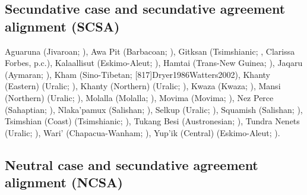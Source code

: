 \documentclass{scrartcl}
\begin{document}
\subsection{Secundative case and secundative agreement alignment (SCSA)}\label{sapp:scsa}

{\footnotesize
Aguaruna (Jivaroan; \cites[120, 215, 444]{Overall2007}[63]{Birchall2014}), Awa
Pit (Barbacoan; \cite[73, 74, 76, 102]{Curnow1997}), Gitksan
(Tsimshianic; \cites[129, 157]{Forbes2018}[4]{BroFor2018}, Clarissa Forbes,
p.c.), Kalaallisut (Eskimo-Aleut; \cite{Fortescue1984}), Hamtai (Trans-New
Guinea; \cite[45, 47, 62]{OatOat1968}), Jaqaru (Aymaran; \cite[56, 79, 93,
103]{Hardman1966}), Kham (Sino-Tibetan; \cite[44, 46,
54]{Watters1973}[817]{Dryer1986}{Watters2002}), Khanty (Eastern)
(Uralic; \cite[9]{FGulyas2018}), Khanty (Northern)
(Uralic; \cite[40]{Nikolaeva1999,DalNik2011}), Kwaza (Kwaza; \cite[106, 110,
112--113]{vanderVoort2004}), Mansi (Northern) (Uralic; \cite[46]{BirSip2017}),
Molalla (Molalla; \cite[138, 141, 188--189, 197--199, 205, 210, 243, 268, 277,
279--280, 305, 315]{Pharris2006}), Movima (Movima; \cite[276, 279, 329, 356,
404]{Haude2006}), Nez Perce (Sahaptian; \cite{Deal2010,Deal2013,Deal2019}),
Nlaka’pamux (Salishan; \cite[32]{ThomThom1980}), Selkup
(Uralic; \cite[34]{WagSze2013}), Squamish (Salishan; \cites[233,
257]{Kuipers1967}[50]{Kiyosawa2006}), Tsimshian (Coast) (Tsimshianic; \cite[40,
60, 267]{Sasama2001}), Tukang Besi (Austronesian; \cite[47--50,
102--103]{Donohue1999}), Tundra Nenets (Uralic; \cite[236]{Nikolaeva2014}), Wari’
(Chapacua-Wanham; \cite[119]{EveKer1997}), Yup’ik (Central)
(Eskimo-Aleut; \cite{Miyaoka2010}).
}

\subsection{Neutral case and secundative agreement alignment (NCSA)}\label{sapp:ncsa}
\end{document}
